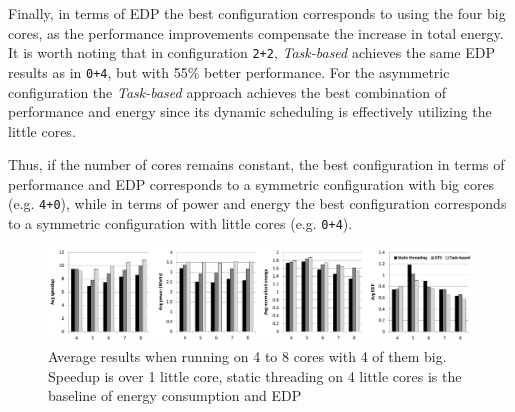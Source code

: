 Finally, in terms of EDP the best configuration corresponds to using the four big cores, as the performance improvements compensate the increase in total energy. It is worth noting that in configuration \texttt{2+2}, \emph{Task-based} achieves the same EDP results as in \texttt{0+4}, but with 55\% better performance. For the asymmetric configuration the \emph{Task-based} approach achieves the best combination of performance and energy since its dynamic scheduling is effectively utilizing the little cores. 


Thus, if the number of cores remains constant, the best configuration in terms of performance and EDP corresponds to a symmetric configuration with big cores (e.g. \texttt{4+0}), while in terms of power and energy the best configuration corresponds to a symmetric configuration with little cores (e.g. \texttt{0+4}). 

\begin{figure}[t]%
	\centering
	\includegraphics[width=\textwidth]{figures/averages_4plus.pdf}
	\vspace{-0.5cm}
	\caption{Average results when running on 4 to  8 cores with 4 of them big. Speedup is over 1 little core, static threading on 4 little cores is the baseline of energy consumption and EDP}
	\label{fig:averages4plus}%
	\vspace{-0.3cm}
\end{figure}


